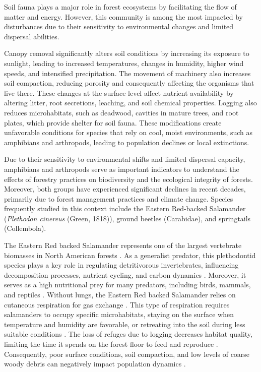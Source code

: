 %

Soil fauna plays a major role in forest ecosystems by facilitating the flow of matter and energy. 
However, this community is among the most impacted by disturbances due to their sensitivity to environmental changes and limited dispersal abilities.

Canopy removal significantly alters soil conditions by increasing its exposure to sunlight, leading to increased temperatures, changes in humidity, higher wind speeds, and intensified precipitation. 
The movement of machinery also increases soil compaction, reducing porosity and consequently affecting the organisms that live there.
These changes at the surface level affect nutrient availability by altering litter, root secretions, leaching, and soil chemical properties. 
Logging also reduces microhabitats, such as deadwood, cavities in mature trees, and root plates, which provide shelter for soil fauna. 
These modifications create unfavorable conditions for species that rely on cool, moist environments, such as amphibians and arthropods, leading to population declines or local extinctions.

Due to their sensitivity to environmental shifts and limited dispersal capacity, amphibians and arthropods serve as important indicators to understand the effects of forestry practices on biodiversity and the ecological integrity of forests. 
Moreover, both groups have experienced significant declines in recent decades, primarily due to forest management practices and climate change. 
Species frequently studied in this context include the Eastern Red-backed Salamander (\textit{Plethodon cinereus} (Green, 1818)), ground beetles (Carabidae), and springtails (Collembola).

The Eastern Red backed Salamander represents one of the largest vertebrate biomasses in North American forests \citep{Burton1975Salamanderpopulations,Petranka1993Effectstimber,semlitschAbundanceBiomassProduction2014a}. 
As a generalist predator, this plethodontid species plays a key role in regulating detritivorous invertebrates, influencing decomposition processes, nutrient cycling, and carbon dynamics \citep{Burton1975Energyflow,Wyman1998Experimentalassessment,Walton2013Topdownregulation,Hickerson2017Easternredbacked}. 
Moreover, it serves as a high nutritional prey for many predators, including birds, mammals, and reptiles \citep{Burton1975Energyflow,Pough1987abundancesalamanders}. 
Without lungs, the Eastern Red backed Salamander relies on cutaneous respiration for gas exchange \citep{Heatwole1961Relationsubstrate}. 
This type of respiration requires salamanders to occupy specific microhabitats, staying on the surface when temperature and humidity are favorable, or retreating into the soil during less suitable conditions \citep{Grizzell1949HibernationSite,FraserEmpiricalEvaluation1976,Jaeger1980MicrohabitatsTerrestrial}. 
The loss of refuges due to logging decreases habitat quality, limiting the time it spends on the forest floor to feed and reproduce \citep{Achat2015Quantifyingconsequences,Peele2017EffectsWoody}. 
Consequently, poor surface conditions, soil compaction, and low levels of coarse woody debris can negatively impact population dynamics \citep{Peterman2014Spatialvariation}. 

